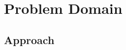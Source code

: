 \documentclass{pdfmx4020}
\begin{document}

\chapter{Problem Domain}
  




  \section{Approach} %
  \label{sec:approach}
\end{document}
